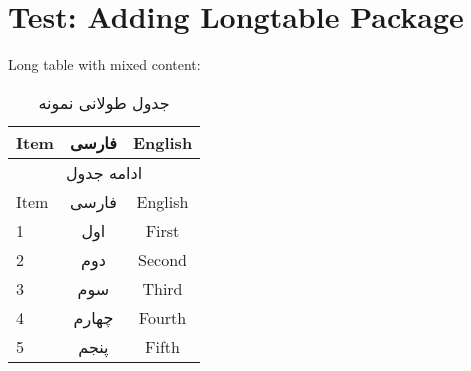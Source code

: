 \documentclass[12pt,a4paper]{article}
\newcommand{\fa}[1]{\textfarsi{#1}}
\newcommand{\en}[1]{\textenglish{#1}}
\begin{document}
\section*{Test: Adding Longtable Package}

\en{Long table with mixed content:}

\begin{longtable}{lcc}
\caption{\fa{جدول طولانی نمونه}} \\
\toprule
\en{Item} & \fa{فارسی} & \en{English} \\
\midrule
\endfirsthead

\multicolumn{3}{c}{\fa{ادامه جدول}} \\
\toprule
\en{Item} & \fa{فارسی} & \en{English} \\
\midrule
\endhead

\bottomrule
\endfoot

1 & \fa{اول} & \en{First} \\
2 & \fa{دوم} & \en{Second} \\
3 & \fa{سوم} & \en{Third} \\
4 & \fa{چهارم} & \en{Fourth} \\
5 & \fa{پنجم} & \en{Fifth} \\

\end{longtable}
\end{document}
